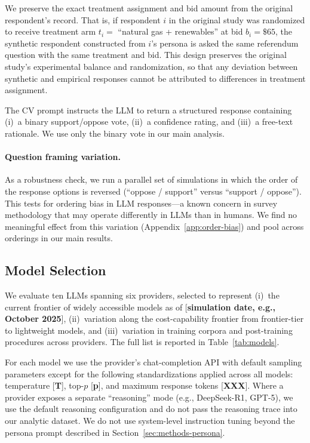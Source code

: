 \documentclass[12pt]{article}
\begin{document}
We preserve the exact treatment assignment and bid amount from the original
respondent's record. That is, if respondent $i$ in the original study was
randomized to receive treatment arm $t_i = $ ``natural gas + renewables''
at bid $b_i = \$65$, the synthetic respondent constructed from $i$'s
persona is asked the same referendum question with the same treatment and
bid. This design preserves the original study's experimental balance and
randomization, so that any deviation between synthetic and empirical
responses cannot be attributed to differences in treatment assignment.

The CV prompt instructs the LLM to return a structured response containing
(i)~a binary support/oppose vote, (ii)~a confidence rating, and (iii)~a
free-text rationale. We use only the binary vote in our main analysis.

\paragraph{Question framing variation.} As a robustness check, we run a
parallel set of simulations in which the order of the response options is
reversed (``oppose / support'' versus ``support / oppose''). This tests
for ordering bias in LLM responses---a known concern in survey methodology
that may operate differently in LLMs than in humans. We find no meaningful
effect from this variation (Appendix~\ref{app:order-bias}) and pool across
orderings in our main results.

\subsection{Model Selection}\label{sec:methods-models}

We evaluate ten LLMs spanning six providers, selected to represent (i)~the
current frontier of widely accessible models as of [\textbf{simulation
date, e.g., October 2025}], (ii)~variation along the cost-capability
frontier from frontier-tier to lightweight models, and (iii)~variation in
training corpora and post-training procedures across providers. The full
list is reported in Table~\ref{tab:models}.

\label{tab:models}

For each model we use the provider's chat-completion API with default
sampling parameters except for the following standardizations applied
across all models: temperature [\textbf{T}], top-$p$ [\textbf{p}], and
maximum response tokens [\textbf{XXX}]. Where a provider exposes a
separate ``reasoning'' mode (e.g., DeepSeek-R1, GPT-5), we use the default
reasoning configuration and do not pass the reasoning trace into our
analytic dataset. We do not use system-level instruction tuning beyond the
persona prompt described in Section~\ref{sec:methods-persona}.
\end{document}
